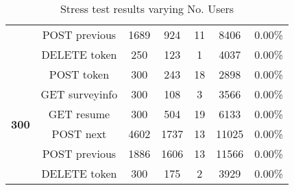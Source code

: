 \begin{table}[H]
\begin{tabular}{|c|c|c|c|c|c|c|}
		\cline{2-7} 
		 & POST previous & 1689 & 924 & 11 & 8406 & 0.00\%\tabularnewline
		\cline{2-7} 
		 & DELETE token & 250 & 123 & 1 & 4037 & 0.00\%\tabularnewline
		\hline 
		\multirow{6}{*}{\textbf{300}} & POST token & 300 & 243 & 18 & 2898 & 0.00\%\tabularnewline
		\cline{2-7} 
		 & GET surveyinfo & 300 & 108 & 3 & 3566 & 0.00\%\tabularnewline
		\cline{2-7} 
		 & GET resume & 300 & 504 & 19 & 6133 & 0.00\%\tabularnewline
		\cline{2-7} 
		 & POST next & 4602 & 1737 & 13 & 11025 & 0.00\%\tabularnewline
		\cline{2-7} 
		 & POST previous & 1886 & 1606 & 13 & 11566 & 0.00\%\tabularnewline
		\cline{2-7} 
		 & DELETE token & 300 & 175 & 2 & 3929 & 0.00\%\tabularnewline
		\hline 
	\end{tabular}
	\caption{Stress test results varying No. Users}\label{tab:eval:stressTest}
	\end{table}